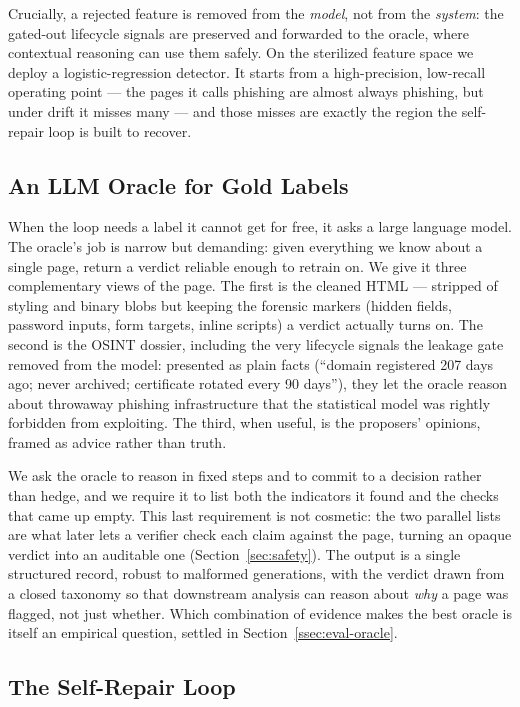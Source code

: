 Crucially, a rejected feature is removed from the \emph{model}, not from the
\emph{system}: the gated-out lifecycle signals are preserved and forwarded to
the oracle, where contextual reasoning can use them safely. On the sterilized
feature space we deploy a logistic-regression detector. It starts from a
high-precision, low-recall operating point --- the pages it calls phishing are
almost always phishing, but under drift it misses many --- and those misses are
exactly the region the self-repair loop is built to recover.

\subsection{An LLM Oracle for Gold Labels}
\label{ssec:oracle}

When the loop needs a label it cannot get for free, it asks a large language
model. The oracle's job is narrow but demanding: given everything we know about
a single page, return a verdict reliable enough to retrain on. We give it three
complementary views of the page. The first is the cleaned HTML --- stripped of
styling and binary blobs but keeping the forensic markers (hidden fields,
password inputs, form targets, inline scripts) a verdict actually turns on. The
second is the OSINT dossier, including the very lifecycle signals the leakage
gate removed from the model: presented as plain facts (``domain registered 207
days ago; never archived; certificate rotated every 90 days''), they let the
oracle reason about throwaway phishing infrastructure that the statistical
model was rightly forbidden from exploiting. The third, when useful, is the
proposers' opinions, framed as advice rather than truth.

We ask the oracle to reason in fixed steps and to commit to a decision rather
than hedge, and we require it to list both the indicators it found and the
checks that came up empty. This last requirement is not cosmetic: the two
parallel lists are what later lets a verifier check each claim against the page,
turning an opaque verdict into an auditable one (Section~\ref{sec:safety}). The
output is a single structured record, robust to malformed generations, with the
verdict drawn from a closed taxonomy so that downstream analysis can reason
about \emph{why} a page was flagged, not just whether. Which combination of
evidence makes the best oracle is itself an empirical question, settled in
Section~\ref{ssec:eval-oracle}.

\subsection{The Self-Repair Loop}
\label{ssec:loop}


